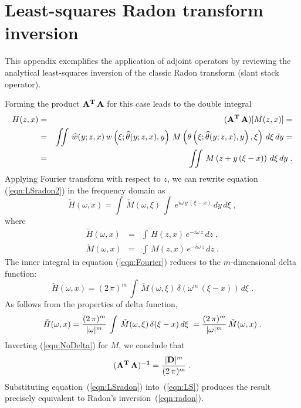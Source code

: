 
\newpage

\section{Least-squares Radon transform inversion}

This appendix exemplifies the application of adjoint operators by
reviewing the analytical least-squares inversion of the classic Radon
transform (slant stack operator).

Forming the product ${\bf A^{T}\,A}$ for this case leads
to the double integral
\begin{eqnarray}
H(z,x) & = & {\bf (A^{T}\,A)}[M(z,x)] = 
\nonumber \\
& = & \iint\,\widehat{w}(y;z,x)\,
w\left(\xi;\widehat{\theta}(y;z,x),y\right)\,
M\left(\theta\left(\xi;\widehat{\theta}(y;z,x),y\right),\xi\right)\,
d\xi\,dy =
\nonumber \\
& = & \iint\,M\left(z + y\,(\xi - x)\right)\,d\xi\,dy\;.
\label{eqn:LSradon2}
\end{eqnarray}
Applying Fourier transform with respect to $z$, we can rewrite
equation (\ref{eqn:LSradon2}) in the frequency domain as
\begin{equation}
\check{H}(\omega,x) = \int\,\check{M}(\omega,\xi)\,\int\,
e^{i\omega\,y\,(\xi-x)}\,dy\,d\xi\;,
\label{eqn:Fourier}
\end{equation}
where
\begin{eqnarray}
\check{H}(\omega,x) & = & \int\,H(z,x)\,e^{-i\omega\,z}\,dz\;,
 \\
\check{M}(\omega,x) & = & \int\,M(z,x)\,e^{-i\omega\,z}\,dz\;.
\end{eqnarray}
The inner integral in equation (\ref{eqn:Fourier}) reduces to the $m$-dimensional
delta function:
\begin{equation}
\check{H}(\omega,x) = (2\,\pi)^m\,\int\,\check{M}(\omega,\xi)\,
\delta\left(\omega^m\,(\xi-x)\right)\,d\xi\;.
\end{equation}
As follows from the properties of delta function,
\begin{equation}
\check{H}(\omega,x) = {{(2\,\pi)^m} \over {|\omega|^m}}\,
\int\,\check{M}(\omega,\xi)\,
\delta(\xi-x)\,d\xi\; = {{(2\,\pi)^m} \over {|\omega|^m}}\,
\check{M}(\omega,x)\;.
\label{eqn:NoDelta}
\end{equation}
Inverting (\ref{eqn:NoDelta}) for $M$, we conclude that
\begin{equation}
{\bf (A^{T}\,A)^{-1}} = {{|{\bf D}|^m} \over {(2\,\pi)^m}}\;.
\label{eqn:LSradon}
\end{equation}
Substituting equation~(\ref{eqn:LSradon}) into~(\ref{eqn:LS}) produces
the result precisely equivalent to Radon's
inversion~(\ref{eqn:radon}).


